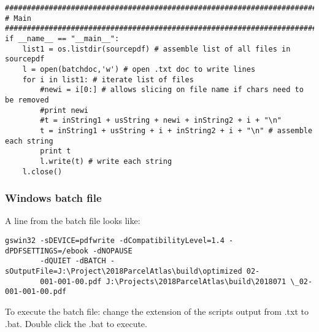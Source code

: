 {\begin{footnotesize}
\begin{verbatim}
################################################################################
# Main
################################################################################
if __name__ == "__main__":
    list1 = os.listdir(sourcepdf) # assemble list of all files in sourcepdf
    l = open(batchdoc,'w') # open .txt doc to write lines
    for i in list1: # iterate list of files
        #newi = i[0:] # allows slicing on file name if chars need to be removed
        #print newi
        #t = inString1 + usString + newi + inString2 + i + "\n"
        t = inString1 + usString + i + inString2 + i + "\n" # assemble each string
        print t
        l.write(t) # write each string
    l.close()
\end{verbatim}
\end{footnotesize}}

\subsubsection{Windows batch file}
A line from the batch file looks like:
{\begin{footnotesize}\color{orange}
\begin{verbatim}
gswin32 -sDEVICE=pdfwrite -dCompatibilityLevel=1.4 -dPDFSETTINGS=/ebook -dNOPAUSE
        -dQUIET -dBATCH -sOutputFile=J:\Project\2018ParcelAtlas\build\optimized 02-
        001-001-00.pdf J:\Projects\2018ParcelAtlas\build\2018071 \_02-001-001-00.pdf
\end{verbatim}
\end{footnotesize}}

\noindent To execute the batch file: change the extension of the scripts output from .txt to .bat.  Double click the .bat to execute.




